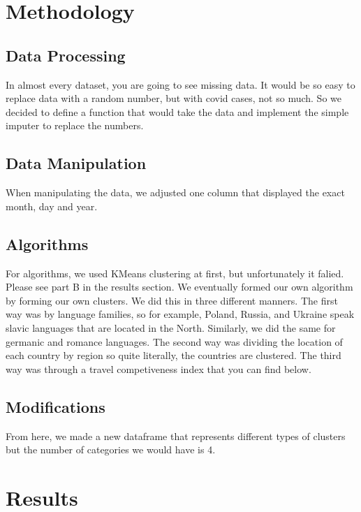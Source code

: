 \documentclass[conference]{IEEEtran}
\begin{document}
\section{Methodology}

\subsection{Data Processing}

In almost every dataset, you are going to see missing data. It would be so easy to replace data with a random number, but with covid cases, not so much. So we decided to define a function that would take the data and implement the simple imputer to replace the numbers.  

\subsection{Data Manipulation}

When manipulating the data, we adjusted one column that displayed the exact month, day and year. 

\subsection{Algorithms}

For algorithms, we used KMeans clustering at first, but unfortunately it falied. Please see part B in the results section. We eventually formed our own algorithm by forming our own clusters. We did this in three different manners. The first way was by language families, so for example, Poland, Russia, and Ukraine speak slavic languages that are located in the North. Similarly, we did the same for germanic and romance languages. The second way was dividing the location of each country by region so quite literally, the countries are clustered. The third way was through a travel competiveness index that you can find below.

\subsection{Modifications}

From here, we made a new dataframe that represents different types of clusters but the number of categories we would have is 4. 

\section{Results}
\end{document}
